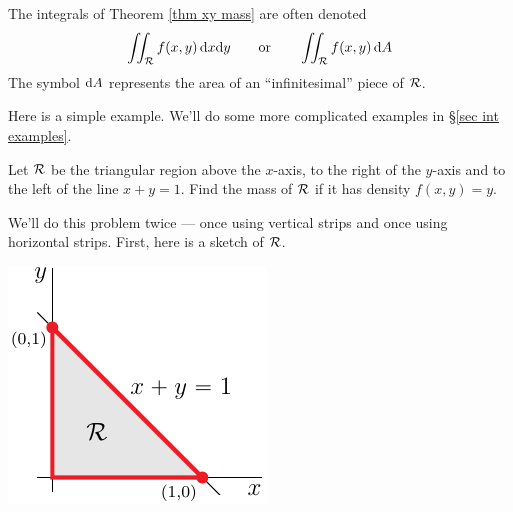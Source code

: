\begin{notn}\label{notn double integral yet again}
The integrals of Theorem \ref{thm xy mass} are often denoted 
\begin{equation*}
\iint_{\mathcal{R}} f(x,y)\,\mathrm{d}x\mathrm{d}y \qquad\text{or}\qquad
\iint_{\mathcal{R}} f(x,y)\,\mathrm{d}A 
\end{equation*}
The symbol $\mathrm{d}A$ represents the area of an ``infinitesimal'' piece
of $\mathcal{R}$.
\end{notn}

Here is a simple example. We'll do some more complicated examples in
\S\ref{sec int examples}.

\begin{eg}\label{eg dblInt 0}
Let $\mathcal{R}$ be the triangular region above the $x$-axis, to the right of
the $y$-axis and to the left of the line $x+y=1$. 
Find the mass of $\mathcal{R}$ if it has density $f(x,y)=y$.

\soln We'll do this problem twice --- once using vertical strips and
once using horizontal strips. First, here is a sketch of $\mathcal{R}$.
\begin{efig}
\begin{center}
   \includegraphics{dblInt0a.pdf}
\end{center}
\end{efig}



\end{eg}
